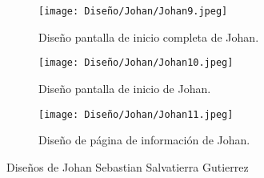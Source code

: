 \begin{figure}[ht!]
  \ContinuedFloat
  \begin{subfigure}{\textwidth}
    \centering
    \texttt{[image: Diseño/Johan/Johan9.jpeg]}
    \caption{Diseño pantalla de inicio completa de Johan.}
    \label{Johan9}
  \end{subfigure}

  \begin{subfigure}{\textwidth}
    \centering
    \texttt{[image: Diseño/Johan/Johan10.jpeg]}
    \caption{Diseño pantalla de inicio de Johan.}
    \label{Johan10}
  \end{subfigure}

  \begin{subfigure}{\textwidth}
    \centering
    \texttt{[image: Diseño/Johan/Johan11.jpeg]}
    \caption{Diseño de página de información de Johan.}
    \label{Johan11}
  \end{subfigure}

  \caption{Diseños de Johan Sebastian Salvatierra Gutierrez}
  \label{fig:disenyoJohan}
\end{figure}